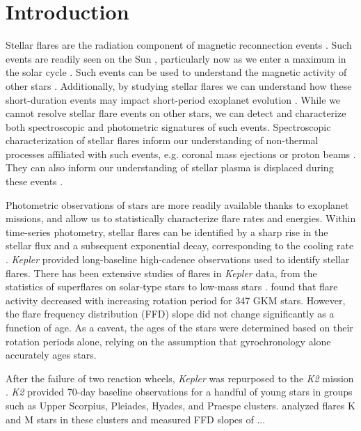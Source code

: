 \documentclass[twocolumn]{aastex631}
\begin{document}
\section{Introduction}
\label{sec:intro}

Stellar flares are the radiation component of magnetic reconnection events \citep{}. Such events are readily seen on the Sun \citep{}, particularly now as we enter a maximum in the solar cycle \citep{}. Such events can be used to understand the magnetic activity of other stars \citep{}. Additionally, by studying stellar flares we can understand how these short-duration events may impact short-period exoplanet evolution \citep{}. While we cannot resolve stellar flare events on other stars, we can detect and characterize both spectroscopic and photometric signatures of such events. Spectroscopic characterization of stellar flares inform our understanding of non-thermal processes affiliated with such events, e.g. coronal mass ejections \citep{} or proton beams \citep{}. They can also inform our understanding of stellar plasma is displaced during these events \citep{}.

Photometric observations of stars are more readily available thanks to exoplanet missions, and allow us to statistically characterize flare rates and energies. Within time-series photometry, stellar flares can be identified by a sharp rise in the stellar flux and a subsequent exponential decay, corresponding to the cooling rate \citep{}. \textit{Kepler} provided long-baseline high-cadence observations used to identify stellar flares. There has been extensive studies of flares in \textit{Kepler} data, from the statistics of superflares on solar-type stars \citep[e.g.]{notsu13, shibayama13, maehara15, okamoto21} to low-mass stars \citep[e.g.]{Hawley14, silverberg16}. \cite{davenport19} found that flare activity decreased with increasing rotation period for 347 GKM stars. However, the flare frequency distribution (FFD) slope did not change significantly as a function of age. As a caveat, the ages of the stars were determined based on their rotation periods alone, relying on the assumption that gyrochronology alone accurately ages stars.


After the failure of two reaction wheels, \textit{Kepler} was repurposed to the \textit{K2} mission \citep{Howell14}. \textit{K2} provided 70-day baseline observations for a handful of young stars in groups such as Upper Scorpius,  Pleiades, Hyades, and Praespe clusters. \cite{ilin19} analyzed flares K and M stars in these clusters and measured FFD slopes of ...
\end{document}
